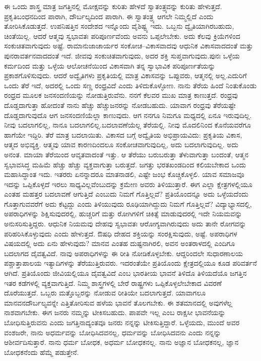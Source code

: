 ಈ ಒಂದು ಶಾಸ್ತ್ರ ಮಾತ್ರ ಜಗತ್ತಿನಲ್ಲಿ ಮೋಕ್ಷವನ್ನು ಕುರಿತು ಹೇಳದೆ ಸ್ವಾತಂತ್ರ್ಯವನ್ನು ಕುರಿತು ಹೇಳುತ್ತದೆ. ಪ್ರಕೃತಿಬಂಧನದಿಂದ ಪಾರಾಗಿ, ದೌರ್ಬಲ್ಯದಿಂದ ಪಾರಾಗಿ. ಈ ಸ್ವಾತಂತ್ರ್ಯ ಆಗಲೇ ನಿಮ್ಮಲ್ಲಿದೆ ಎಂದು ತೋರಿಸಿಕೊಡುತ್ತದೆ. ಉಪನಿಷತ್ತಿನ ಸಂದೇಶದ ಇನ್ನೊಂದು ವೈಶಿಷ್ಟ್ಯ ಇದು. ಒಬ್ಬನು ದ್ವೈತಿಯಾಗಿರಬಹುದು, ಚಿಂತೆಯಿಲ್ಲ. ಆದರೆ ಆತ್ಮವು ಸ್ವಭಾವತಃ ಪರಿಪೂರ್ಣವೆಂದು ಅವನು ಒಪ್ಪಲೇಬೇಕು. ಅದು ಕೆಲವು ಕ್ರಿಯೆಗಳಿಂದ ಸಂಕುಚಿತವಾಗುವುದು ಅಷ್ಟೆ. ರಾಮಾನುಜಾಚಾರ್ಯರ ಸಂಕೋಚ–ವಿಕಾಸವಾದವು ಆಧುನಿಕ ವಿಕಾಸವಾದದಂತೆ ಮತ್ತು ಪುನರಾವರ್ತನವಾದದಂತೆ  ಇದೆ. ಜೀವವು ಸಂಕುಚಿತವಾಗುವುದು, ಅದರ ಶಕ್ತಿ ಸುಪ್ತವಾಗುವುದು.\break ಪುನಃ ಒಳ್ಳೆಯ ಕರ್ಮದಿಂದ ಮತ್ತು ಒಳ್ಳೆಯ ಆಲೋಚನೆಯಿಂದ ವಿಕಾಸವಾಗಿ ತನ್ನ ಸ್ವಾಭಾವಿಕ ಪರಿಪೂರ್ಣತೆಯನ್ನು ಪ್ರಕಾಶಗೊಳಿಸುವುದು. ಆದರೆ ಅದ್ವೈತಿಗಳು ಪ್ರಕೃತಿಯಲ್ಲಿ ಮಾತ್ರ ವಿಕಾಸವನ್ನು ಒಪ್ಪುವರು, ಆತ್ಮನಲ್ಲಿ ಅಲ್ಲ.\break ಎದುರಿಗೆ ಒಂದು ತೆರೆ ಇದೆ, ಅದರಲ್ಲಿ ಒಂದು ಸಣ್ಣ ರಂಧ್ರವಿದೆ ಎಂದು ತಿಳಿದುಕೊಳ್ಳೋಣ. ನಾನು ತೆರೆಯ ಹಿಂದೆ ನಿಂತುಕೊಂಡು ರಂಧ್ರದ ಮೂಲಕ ಜನಸಂದಣಿಯನ್ನು ನೋಡುತ್ತಿರುವೆನು. ನನಗೆ ಕೆಲವರ ಮುಖ ಮಾತ್ರ ಕಾಣುತ್ತದೆ. ರಂಧ್ರವು ದೊಡ್ಡದಾಗುತ್ತಾ ಹೋದಂತೆ ನಾನು ಹೆಚ್ಚು ಹೆಚ್ಚು\break ಜನರನ್ನು ನೋಡಬಹುದು. ಯಾವಾಗ ರಂಧ್ರವು ತೆರೆಯಷ್ಟೇ ದೊಡ್ಡದಾಗುವುದೊ ಆಗ ಜನಸಂದಣಿಯೆಲ್ಲಾ ಕಾಣುವುದು. ಆಗ ನನಗೂ ನಿಮಗೂ ಮಧ್ಯದಲ್ಲಿ ಏನೂ ಇರುವುದಿಲ್ಲ. ನೀವು ಬದಲಾಗಲಿಲ್ಲ, ನಾನೂ ಬದಲಾಗಲಿಲ್ಲ.\break ಬದಲಾವಣೆಯೆಲ್ಲ ತೆರೆಯಲ್ಲಿ. ನೀವು ಮೊದಲಿನಿಂದ ಕೊನೆಯವರೆಗೂ ಹಾಗೆಯೇ ಇದ್ದಿರಿ. ತೆರೆ ಮಾತ್ರ ಬದಲಾಯಿತು. ವಿಕಾಸದ ಬಗ್ಗೆ ಅದ್ವೈತಿಯ ಅಭಿಪ್ರಾಯವಿದು: ಪ್ರಕೃತಿಯ ವಿಕಾಸ, ಆತ್ಮದ ಅಭಿವ್ಯಕ್ತಿ. ಆತ್ಮವು ಯಾವ ಕಾರಣದಿಂದಲೂ ಸಂಕೋಚವಾಗುವುದಿಲ್ಲ, ಅದು ಬದಲಾಗುವುದಿಲ್ಲ. ಅದು ಅನಂತ. ಮಾಯಾ ತೆರೆಯಿಂದ ಆವೃತವಾದಂತೆ ಇತ್ತು. ಆ ತೆರೆಯು ಬರುಬರುತ್ತಾ ತೆಳುವಾಗುತ್ತಾ ಬಂದಂತೆ, ಆತ್ಮನ ಸ್ವಭಾವಸಿದ್ಧ ಮಹಿಮೆ ಹೆಚ್ಚು ಹೆಚ್ಚು ವ್ಯಕ್ತವಾಗುತ್ತಾ ಬರುತ್ತದೆ. ಜಗತ್ತು ಭರತಖಂಡದಿಂದ ಕಲಿಯಬೇಕಾದ ಒಂದು ಮಹಾಸಿದ್ಧಾಂತ ಇದು. ಇತರರು ಏನನ್ನಾದರೂ ಮಾತನಾಡಲಿ, ಎಷ್ಟೇ ಜಂಭ ಕೊಚ್ಚಿಕೊಳ್ಳಲಿ. ಯಾವ ಸಮಾಜವೂ ಇದನ್ನು ಒಪ್ಪಿಕೊಳ್ಳದೆ ಇರಲು ಸಾಧ್ಯವಿಲ್ಲವೆಂಬುದನ್ನು ಕ್ರಮೇಣ ಅವರು ತಿಳಿಯುತ್ತಾರೆ. ಈಗ ಎಲ್ಲಾ ಕ್ಷೇತ್ರಗಳಲ್ಲಿಯೂ ಎಂತಹ ಮಹತ್ತರ ಬದಲಾವಣೆ ಆಗುತ್ತಿದೆ ಎಂಬುದು ನಿಮಗೆ ಗೊತ್ತಿಲ್ಲವೆ? ಪ್ರತಿಯೊಂದನ್ನೂ ಅದು ಒಳ್ಳೆಯದೆಂದು ಗೊತ್ತಾಗುವವರೆಗೆ ಅದು ಕೆಟ್ಟದ್ದು ಎಂದು ತಿಳಿಯುವುದು ರೂಢಿಯಾಗಿದ್ದುದು ನಿಮಗೆ ಗೊತ್ತಿಲ್ಲವೆ? ವಿದ್ಯಾ\-ಭ್ಯಾಸದಲ್ಲಿ, ಅಪರಾಧಿಗಳನ್ನು ಶಿಕ್ಷಿಸುವುದರಲ್ಲಿ, ಹುಚ್ಚರಿಗೆ ಮತ್ತು ರೋಗಿಗಳಿಗೆ ಚಿಕಿತ್ಸೆ ಮಾಡುವುದರಲ್ಲಿ ಇದೇ ನಿಯಮವನ್ನು ಅನುಸರಿಸುತ್ತಿದ್ದರು. ಆಧುನಿಕ ನಿಯಮವು ದೇಹವು ಸ್ವಭಾವತಃ ಆರೋಗ್ಯವಾಗಿರುವುದು ಅದು ತಾನೇ ರೋಗವನ್ನು ಪರಿಹರಿಸಿಕೊಳ್ಳುವುದು ಎಂದು ಹೇಳುತ್ತದೆ. ಔಷಧಿ ದೇಹದ ಶಕ್ತಿಯನ್ನು ಸಂರಕ್ಷಿಸುವುದು, ಅಷ್ಟೆ. ಅಪರಾಧಿಗಳ ವಿಷಯದಲ್ಲಿ ಅದು ಏನು ಹೇಳುವುದು? ಮಾನವ ಎಂತಹ ದುಷ್ಟನಾಗಿರಲಿ, ಅವನ ಅಂತರಾಳದಲ್ಲಿ ಎಂದಿಗೂ ಬದಲಾಗದ ದೈವತ್ವವಿದೆ. ನಾವು ಅಪರಾಧಿಗಳನ್ನು ಈ ರೀತಿ ನೋಡಿಕೊಳ್ಳಬೇಕು. ಆದ್ದರಿಂದಲೇ ಸುಧಾರಣಾಲಯ  ಪಶ್ಚಾತ್ತಾಪಾಲಯ  ಇತ್ಯಾದಿಗಳನ್ನು ತೆರೆಯುತ್ತಿರುವರು. ಇದರಂತೆಯೇ ಪ್ರತಿಯೊಂದು ಕ್ಷೇತ್ರದಲ್ಲಿಯೂ ಕೂಡ ಪರಿವರ್ತನೆ ಆಗಿದೆ. ಪ್ರತಿಯೊಂದು ಜೀವಿಯಲ್ಲಿಯೂ ದೈವತ್ವವಿದೆ ಎಂಬ ಭಾರತೀಯ ಭಾವನೆ ತಿಳಿದೊ ತಿಳಿಯದೆಯೊ ಜಗತ್ತಿನ ಇತರ ಕಡೆಗಳಲ್ಲಿ ವ್ಯಕ್ತವಾಗುತ್ತಿದೆ. ನಿಮ್ಮ ಶಾಸ್ತ್ರಗಳಲ್ಲಿ ಬೇರೆ ರಾಷ್ಟ್ರಗಳು ಒಪ್ಪಿಕೊಳ್ಳಲೇಬೇಕಾದ ವಿವರಣೆ ದೊರೆಯುತ್ತದೆ. ಒಬ್ಬರು ಮತ್ತೊಬ್ಬರನ್ನು ನೋಡುವ ರೀತಿಯೇ ಬದಲಾಗುತ್ತದೆ. ಯಾವಾಗಲೂ ಮಾನವನ\break ದೌರ್ಬಲ್ಯವನ್ನೇ ಎತ್ತಿತೋರಿಸುವ ಹಳೆಯ ಭಾವನೆ ತೊಲಗಬೇಕು. ಈ ಶತಮಾನದಲ್ಲಿ ಅವುಗಳೆಲ್ಲ ನಾಶವಾಗಬೇಕು. ಈಗ ಜನರು ನಮ್ಮನ್ನು ಟೀಕಿಸಬಹುದು. ಪಾಪವೇ ಇಲ್ಲ ಎಂಬ ರಾಕ್ಷಸೀ ಭಾವನೆಯನ್ನು ಬೋಧಿಸುತ್ತಿರುವನು ಎಂದು ಜಗತ್ತಿನಾದ್ಯಂತವೂ ಜನರು ನನ್ನನ್ನು ಟೀಕಿಸುತ್ತಿದ್ದಾರೆ. ಒಳ್ಳೆಯದು, ಮುಂದೆ ಅವರ ವಂಶಜರೇ, ನಾನು ಅಧರ್ಮವನ್ನು ಬೋಧಿಸಿದವನಲ್ಲ, ಧರ್ಮವನ್ನು ಬೋಧಿಸಿದವನು ಎಂದು ನನ್ನನ್ನು ಆಶೀರ್ವದಿಸುತ್ತಾರೆ. ನಾನು ಧರ್ಮ ಬೋಧಕ, ಅಧರ್ಮ ಬೋಧಕನಲ್ಲ. ನಾನು ಅಜ್ಞಾನ ಬೋಧಕನಲ್ಲ, ಜ್ಞಾನ ಬೋಧಕನೆಂದು ಹೆಮ್ಮೆ ಪಡುತ್ತೇನೆ.

